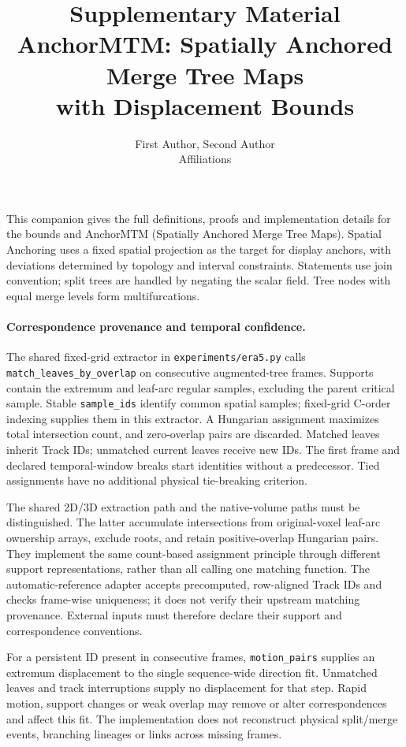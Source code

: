 \documentclass[10pt]{article}
\title{Supplementary Material\\\large AnchorMTM: Spatially Anchored Merge Tree Maps\\with Displacement Bounds}
\author{First Author, Second Author\\\normalsize Affiliations}  %
\begin{document}
\maketitle
This companion gives the full definitions, proofs and implementation details for the bounds and AnchorMTM (Spatially Anchored Merge Tree Maps). Spatial Anchoring uses a fixed spatial projection as the target for display anchors, with deviations determined by topology and interval constraints. Statements use join convention; split trees are handled by negating the scalar field. Tree nodes with equal merge levels form multifurcations.
\paragraph{Correspondence provenance and temporal confidence.}
The shared fixed-grid extractor in \texttt{experiments/era5.py} calls \texttt{match\_leaves\_by\_overlap} on consecutive augmented-tree frames. Supports contain the extremum and leaf-arc regular samples, excluding the parent critical sample. Stable \texttt{sample\_ids} identify common spatial samples; fixed-grid C-order indexing supplies them in this extractor. A Hungarian assignment maximizes total intersection count, and zero-overlap pairs are discarded. Matched leaves inherit Track IDs; unmatched current leaves receive new IDs. The first frame and declared temporal-window breaks start identities without a predecessor. Tied assignments have no additional physical tie-breaking criterion.

The shared 2D/3D extraction path and the native-volume paths must be distinguished. The latter accumulate intersections from original-voxel leaf-arc ownership arrays, exclude roots, and retain positive-overlap Hungarian pairs. They implement the same count-based assignment principle through different support representations, rather than all calling one matching function. The automatic-reference adapter accepts precomputed, row-aligned Track IDs and checks frame-wise uniqueness; it does not verify their upstream matching provenance. External inputs must therefore declare their support and correspondence conventions.

For a persistent ID present in consecutive frames, \texttt{motion\_pairs} supplies an extremum displacement to the single sequence-wide direction fit. Unmatched leaves and track interruptions supply no displacement for that step. Rapid motion, support changes or weak overlap may remove or alter correspondences and affect this fit. The implementation does not reconstruct physical split/merge events, branching lineages or links across missing frames.
\end{document}
